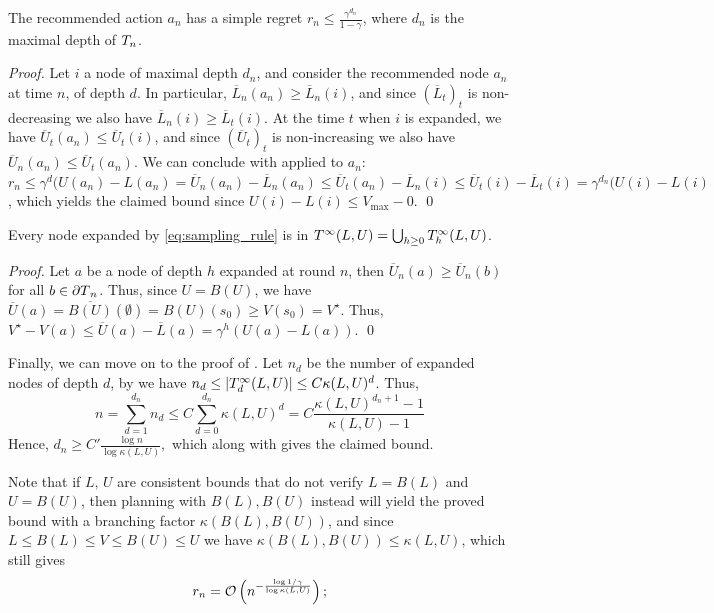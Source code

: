 \documentclass[runningheads]{llncs}
\begin{document}
\begin{lemma}
The recommended action $a_n$ has a simple regret $r_n \leq \frac{\gamma^{d_n}}{1-\gamma}$, where $d_n$ is the maximal depth of $T_n$.
\end{lemma}
\begin{proof}
Let $i$ a node of maximal depth $d_n$, and consider the recommended node $a_n$ at time $n$, of depth $d$. In particular, $\overline{L}_n(a_n) \geq \overline{L}_n(i)$, and since $(\overline{L}_t)_t$ is non-decreasing we also have $\overline{L}_n(i) \geq \overline{L}_t(i)$. At the time $t$ when $i$ is expanded, we have $\overline{U}_t(a_n) \leq \overline{U}_t(i)$, and since $(\overline{U}_t)_t$ is non-increasing we also have $\overline{U}_n(a_n) \leq \overline{U}_t(a_n)$. We can conclude with  applied to $a_n$: $r_n \leq \gamma^d(U(a_n)-L(a_n) = \overline{U}_n(a_n) - \overline{L}_n(a_n)  \leq \overline{U}_t(a_n) - \overline{L}_n(i) \leq \overline{U}_t(i) - \overline{L}_t(i) = \gamma^{d_n}(U(i) - L(i)$, which yields the claimed bound since $U(i) - L(i) \leq V_{\max}-0$.
\qed\end{proof}

\begin{lemma}
\label{lemma:expansion-tree}
Every node expanded by \eqref{eq:sampling_rule} is in $T^\infty(L,U) = \bigcup_{h\geq 0} T^\infty_h(L,U)$.
\end{lemma}
\begin{proof}
Let $a$ be a node of depth $h$ expanded at round $n$, then $\overline{U}_n(a) \geq \overline{U}_n(b)$ for all $b\in{\partial T}_n$. Thus, since $U = B(U)$, we have $\overline{U}(a) = \overline{B(U)}(\emptyset) = B(U)(s_0) \geq V(s_0) = V^\star$. Thus, $V^\star - V(a) \leq \overline{U}(a) - \overline{L}(a) = \gamma^h(U(a) - L(a))$.
\qed\end{proof}

Finally, we can move on to the proof of .
Let $n_d$ be the number of expanded nodes of depth $d$, by  we have $n_d \leq |T^\infty_d(L,U)| \leq C\kappa(L,U)^d$. Thus, 
\[n = \sum_{d=1}^{d_n} n_d \leq C\sum_{d=0}^{d_n} \kappa(L,U)^d = C\frac{\kappa(L,U)^{d_n+1}-1}{\kappa(L,U)-1}\]
Hence, $d_n \geq C'\frac{\log n}{\log\kappa(L,U)},$ which along with  gives the claimed bound.

Note that if $L,\,U$ are consistent bounds that do not verify $L = B(L)$ and $U=B(U)$, then planning with $B(L),B(U)$ instead will yield the proved bound with a branching factor $\kappa(B(L),B(U))$, and since $L\leq B(L)\leq V\leq B(U)\leq U$ we have $\kappa(B(L),B(U)) \leq \kappa(L,U)$, which still gives \begin{align*}
r_n = \mathcal{O}\left(n^{-\frac{\log 1/\gamma}{\log \kappa(L,U)}}\right);
\end{align*}
\end{document}
